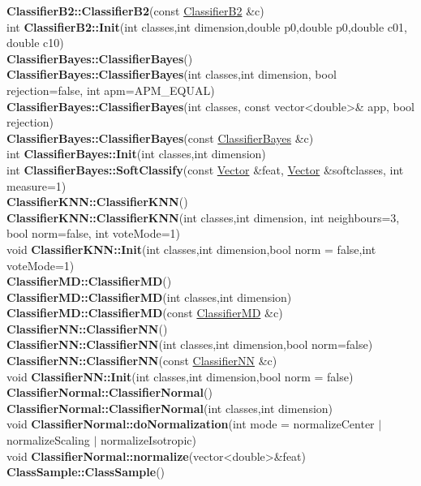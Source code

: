 \documentclass[10pt,titlepage]{article}
\def\functionlistentry#1#2#3#4#5#6{\noindent #1 {\bf #2}(#3) \dotfill #6\\}
\begin{document}
{{\functionlistentry{}{ClassifierB2::ClassifierB2}{const \hyperlink{ClassifierB2}{ClassifierB2} \&c}{980}{classification}{}
\functionlistentry{int}{ClassifierB2::Init}{int classes,int dimension,double p0,double p0,double c01, double c10}{981}{classification}{}
\functionlistentry{}{ClassifierBayes::ClassifierBayes}{}{982}{classification}{}
\functionlistentry{}{ClassifierBayes::ClassifierBayes}{int classes,int dimension, bool rejection=false, int apm=APM\_EQUAL}{983}{classification}{}
\functionlistentry{}{ClassifierBayes::ClassifierBayes}{int classes, const vector\textless {}double\textgreater  \& app, bool rejection}{984}{classification}{}
\functionlistentry{}{ClassifierBayes::ClassifierBayes}{const \hyperlink{ClassifierBayes}{ClassifierBayes} \&c}{985}{classification}{}
\functionlistentry{int}{ClassifierBayes::Init}{int classes,int dimension}{986}{classification}{}
\functionlistentry{int}{ClassifierBayes::SoftClassify}{const \hyperlink{Vector}{Vector} \&feat, \hyperlink{Vector}{Vector} \&softclasses, int measure=1}{987}{classification}{}
\functionlistentry{}{ClassifierKNN::ClassifierKNN}{}{975}{classification}{}
\functionlistentry{}{ClassifierKNN::ClassifierKNN}{int classes,int dimension, int neighbours=3, bool norm=false, int voteMode=1}{976}{classification}{}
\functionlistentry{void}{ClassifierKNN::Init}{int classes,int dimension,bool norm = false,int voteMode=1}{977}{classification}{}
\functionlistentry{}{ClassifierMD::ClassifierMD}{}{968}{classification}{}
\functionlistentry{}{ClassifierMD::ClassifierMD}{int classes,int dimension}{969}{classification}{}
\functionlistentry{}{ClassifierMD::ClassifierMD}{const \hyperlink{ClassifierMD}{ClassifierMD} \&c}{970}{classification}{}
\functionlistentry{}{ClassifierNN::ClassifierNN}{}{971}{classification}{}
\functionlistentry{}{ClassifierNN::ClassifierNN}{int classes,int dimension,bool norm=false}{972}{classification}{}
\functionlistentry{}{ClassifierNN::ClassifierNN}{const \hyperlink{ClassifierNN}{ClassifierNN} \&c}{973}{classification}{}
\functionlistentry{void}{ClassifierNN::Init}{int classes,int dimension,bool norm = false}{974}{classification}{}
\functionlistentry{}{ClassifierNormal::ClassifierNormal}{}{964}{classification}{}
\functionlistentry{}{ClassifierNormal::ClassifierNormal}{int classes,int dimension}{965}{classification}{}
\functionlistentry{void}{ClassifierNormal::doNormalization}{int mode = normalizeCenter $|$ normalizeScaling $|$ normalizeIsotropic}{966}{classification}{}
\functionlistentry{void}{ClassifierNormal::normalize}{vector\textless {}double\textgreater  \&feat}{967}{classification}{}
\functionlistentry{}{ClassSample::ClassSample}{}{938}{classification}{}
}}
\end{document}
